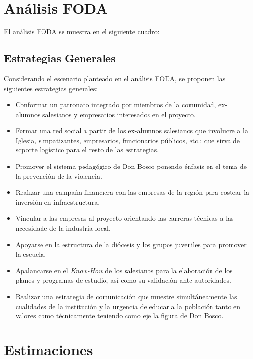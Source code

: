 

\clearpage
\section{Análisis FODA}

El análisis FODA se muestra en el siguiente cuadro:



\subsection{Estrategias Generales}

Considerando el escenario planteado en el análisis FODA, se proponen las siguientes estrategias generales:

\begin{itemize}
	\item Conformar un patronato integrado por miembros de la comunidad, ex-alumnos salesianos y empresarios interesados en el proyecto.
	\item Formar una red social a partir de los ex-alumnos salesianos que involucre a la Iglesia, simpatizantes, empresarios, funcionarios públicos, etc.; que sirva de soporte logístico para el resto de las estrategias.
	\item Promover el sistema pedagógico de Don Bosco ponendo énfasis en el tema de la prevención de la violencia.
	\item Realizar una campaña financiera con las empresas de la región para costear la inversión en infraestructura.
	\item Vincular a las empresas al proyecto orientando las carreras técnicas a las necesidade de la industria local.
	\item Apoyarse en la estructura de la diócesis y los grupos juveniles para promover la escuela.
	\item Apalancarse en el \emph{Know-How} de los salesianos para la elaboración de los planes y programas de estudio, así como su validación ante autoridades.
	\item Realizar una estrategia de comunicación que muestre simultáneamente las cualidades de la institución y la urgencia de educar a la población tanto en valores como técnicamente teniendo como eje la figura de Don Bosco.
\end{itemize}

\clearpage

\section{Estimaciones}

